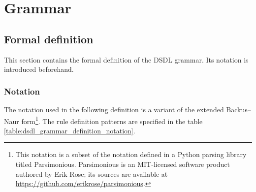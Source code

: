 \section{Grammar}

\subsection{Formal definition}

This section contains the formal definition of the DSDL grammar.
Its notation is introduced beforehand.

\subsubsection{Notation}

The notation used in the following definition is a variant of the extended Backus--Naur
form\footnote{This notation is a subset of the notation defined in a Python parsing library titled Parsimonious.
Parsimonious is an MIT-licensed software product authored by Erik Rose;
its sources are available at \url{https://github.com/erikrose/parsimonious}.}.
The rule definition patterns are specified in the table \ref{table:dsdl_grammar_definition_notation}.

